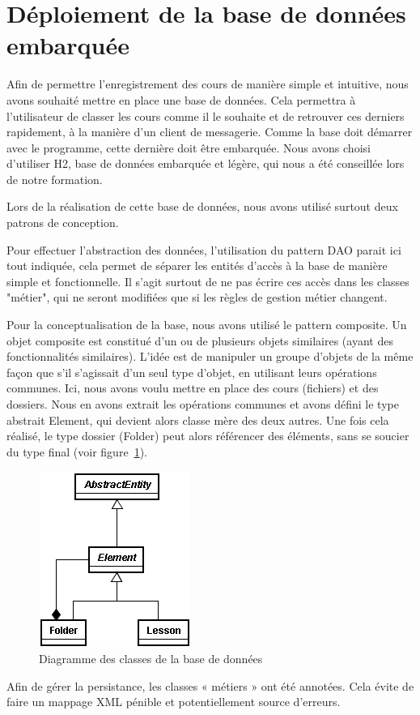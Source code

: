 \section{Déploiement de la base de données embarquée}

Afin de permettre l’enregistrement des cours de manière simple et intuitive, nous avons souhaité mettre en place une base de données. 
Cela permettra à l’utilisateur de classer les cours comme il le souhaite et de retrouver ces derniers rapidement, à la manière d’un client de messagerie.
Comme la base doit démarrer avec le programme, cette dernière doit être embarquée.
Nous avons choisi d’utiliser H2, base de données embarquée et légère, qui nous a été conseillée lors de notre formation.

Lors de la réalisation de cette base de données, nous avons utilisé surtout deux patrons de conception. 

Pour effectuer l’abstraction des données, l’utilisation du pattern DAO parait ici tout indiquée, cela permet de séparer les entités d'accès à la base de manière simple et fonctionnelle.
Il s'agit surtout de ne pas écrire ces accès dans les classes "métier", qui ne seront modifiées que si les règles de gestion métier changent.

Pour la conceptualisation de la base, nous avons utilisé le pattern composite.
Un objet composite est constitué d'un ou de plusieurs objets similaires (ayant des fonctionnalités similaires). 
L'idée est de manipuler un groupe d'objets de la même façon que s'il s'agissait d'un seul type d’objet, en utilisant leurs opérations communes.
Ici, nous avons voulu mettre en place des cours (fichiers) et des dossiers.
Nous en avons extrait les opérations communes et avons défini le type abstrait Element, qui devient alors classe mère des deux autres.
Une fois cela réalisé, le type dossier (Folder) peut alors référencer des éléments, sans se soucier du type final  (voir figure~\ref{fig:compositeDiagram}).

\begin{figure}[ht!]
 \centering
 \includegraphics[scale=1,keepaspectratio=true]{./images/CompositeDiagram.png}
 \caption{Diagramme des classes de la base de données}
 \label{fig:compositeDiagram}
\end{figure}

Afin de gérer la persistance,  les classes « métiers » ont été annotées. Cela évite de faire un mappage XML pénible et potentiellement source d’erreurs.

